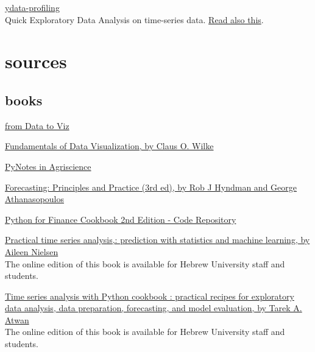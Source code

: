 \documentclass[
  letterpaper,
  DIV=11,
  numbers=noendperiod,
  oneside]{scrreprt}
\begin{document}
\href{https://ydata-profiling.ydata.ai/docs/master/pages/use_cases/time_series_datasets.html}{ydata-profiling}\\
Quick Exploratory Data Analysis on time-series data.
\href{https://towardsdatascience.com/how-to-do-an-eda-for-time-series-cbb92b3b1913}{Read
also this}.


\hypertarget{sources}{%
\chapter*{sources}\label{sources}}


\hypertarget{books}{%
\section*{books}\label{books}}


\href{https://www.data-to-viz.com}{from Data to Viz}

\href{https://clauswilke.com/dataviz/}{Fundamentals of Data
Visualization, by Claus O. Wilke}

\href{https://soilwater.github.io/pynotes-agriscience/intro.html}{PyNotes
in Agriscience}

\href{https://otexts.com/fpp3/}{Forecasting: Principles and Practice
(3rd ed), by Rob J Hyndman and George Athanasopoulos}

\href{https://github.com/erykml/Python-for-Finance-Cookbook-2E}{Python
for Finance Cookbook 2nd Edition - Code Repository}

\href{https://huji.primo.exlibrisgroup.com/permalink/972HUJI_INST/10ptda2/alma9920842016603701}{Practical
time series analysis,: prediction with statistics and machine learning,
by Aileen Nielsen}\\
The online edition of this book is available for Hebrew University staff
and students.

\href{https://huji.primo.exlibrisgroup.com/permalink/972HUJI_INST/10ptda2/alma9921049267803701}{Time
series analysis with Python cookbook : practical recipes for exploratory
data analysis, data preparation, forecasting, and model evaluation, by
Tarek A. Atwan}\\
The online edition of this book is available for Hebrew University staff
and students.
\end{document}
